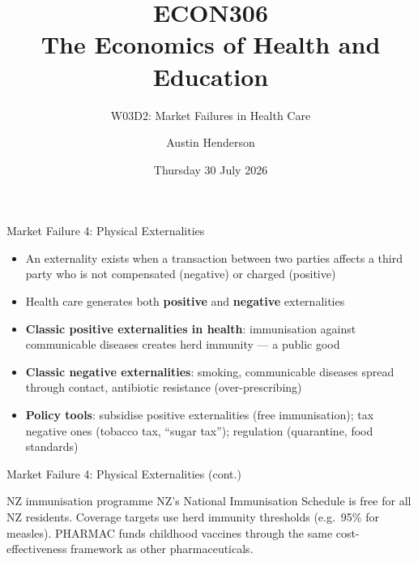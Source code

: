 \documentclass[aspectratio=169, 12pt]{beamer}
\title[ECON306: W03D2 — Market Failures]{ECON306\\The Economics of Health and Education}
\subtitle{W03D2: Market Failures in Health Care}
\author{Austin Henderson}
\institute{Department of Economics\\University of Otago}
\date{Thursday 30 July 2026}
\begin{document}
\begin{frame}[plain]
  \titlepage
\end{frame}



\begin{frame}{Market Failure 4: Physical Externalities}
  \begin{itemize}
    \item An externality exists when a transaction between two parties affects a third party
          who is not compensated (negative) or charged (positive)
    \item Health care generates both \textbf{positive} and \textbf{negative} externalities
    \item \textbf{Classic positive externalities in health}: immunisation against communicable
          diseases creates herd immunity --- a public good
    \item \textbf{Classic negative externalities}: smoking, communicable diseases spread through
          contact, antibiotic resistance (over-prescribing)
    \item \textbf{Policy tools}: subsidise positive externalities (free immunisation); tax
          negative ones (tobacco tax, ``sugar tax''); regulation (quarantine, food standards)
  \end{itemize}
\end{frame}

\begin{frame}{Market Failure 4: Physical Externalities (cont.)}
  \begin{exampleblock}{NZ immunisation programme}
    NZ's National Immunisation Schedule is free for all NZ residents. Coverage targets use
    herd immunity thresholds (e.g.\ 95\% for measles). PHARMAC funds childhood vaccines through
    the same cost-effectiveness framework as other pharmaceuticals.
  \end{exampleblock}
\end{frame}
\end{document}
